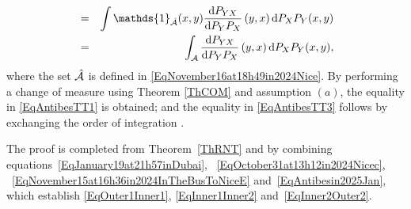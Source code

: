 \documentclass[lettersize,onecolumn]{IEEEtran}
\begin{document}
\begin{IEEEproof}
\begin{eqnarray}
&=& \int \mathds{1}_{\hat{\set{A}}}(x,y)\frac{ \mathrm{d}P_{YX}} { \mathrm{d} P_YP_X}\left(y,x\right) \mathrm{d}P_XP_Y(x,y)\\ 
\label{EqAntibesin2025Jan}
&=& \int_{\set{A}} \frac{ \mathrm{d}P_{YX}} { \mathrm{d} P_YP_X}\left(y,x\right) \mathrm{d}P_XP_Y(x,y), 
\end{eqnarray}
where the set $\hat{\mathcal A}$ is defined in \eqref{EqNovember16at18h49in2024Nice}. By performing a change of measure using Theorem \ref{ThCOM} and assumption $\left(a\right)$, the equality in \eqref{EqAntibesTT1} is obtained; and the equality in \eqref{EqAntibesTT3} follows by exchanging the order of integration \cite[Theorem~2.6.6]{ash2000probability}. 

The proof is completed from Theorem~\ref{ThRNT} and by combining equations~\eqref{EqJanuary19at21h57inDubai}, ~\eqref{EqOctober31at13h12in2024Nicec}, ~\eqref{EqNovember15at16h36in2024InTheBusToNiceE} and~\eqref{EqAntibesin2025Jan}, which establish \eqref{EqOuter1Inner1}, \eqref{EqInner1Inner2} and~\eqref{EqInner2Outer2}.
\end{IEEEproof}
\end{document}
